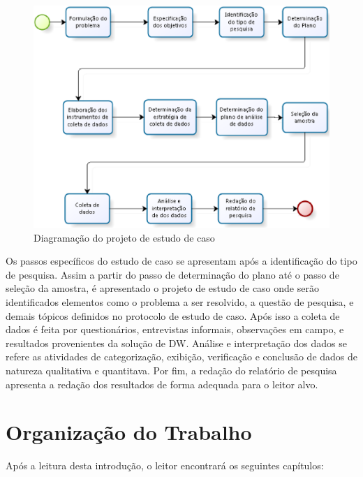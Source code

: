 \begin{figure}[h!]
\centering
\includegraphics[keepaspectratio=false,scale=0.53]{figuras/figuras_pedro/projeto-pesq.eps}
\caption{Diagramação do projeto de estudo de caso}
\label{fig:projeto-pesq}
\end{figure}
\FloatBarrier


Os passos específicos do estudo de caso se apresentam após a identificação do tipo de pesquisa. Assim a partir do passo de determinação do plano até o passo de seleção da amostra, é apresentado o projeto de estudo de caso onde serão identificados elementos como o problema a ser resolvido, a questão de pesquisa, e demais tópicos definidos no protocolo de estudo de caso. Após isso a coleta de dados é feita por questionários, entrevistas informais, observações em campo, e resultados provenientes da solução de DW. Análise e interpretação dos dados se refere as atividades de categorização,  exibição, verificação e conclusão de dados de natureza qualitativa e quantitava. Por fim, a redação do relatório de pesquisa apresenta a redação dos resultados de forma adequada para o leitor alvo.


\section{Organização do Trabalho}


Após a leitura desta introdução, o leitor encontrará os seguintes capítulos:

